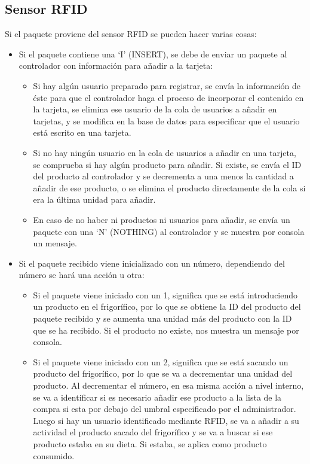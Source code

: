 \subsection{Sensor RFID}
Si el paquete proviene del sensor RFID se pueden hacer varias cosas:
\begin{itemize}
    \item Si el paquete contiene una ‘I’ (INSERT), se debe de enviar un paquete al controlador con información para añadir a la tarjeta: 
    \begin{itemize}
        \item Si hay algún usuario preparado para registrar, se envía la información de éste para que el controlador haga el proceso de incorporar el contenido en la tarjeta, se elimina ese usuario de la cola de usuarios a añadir en tarjetas, y se modifica en la base de datos para especificar que el usuario está escrito en una tarjeta.
        \item Si no hay ningún usuario en la cola de usuarios a añadir en una tarjeta, se comprueba si hay algún producto para añadir. Si existe, se envía el ID del producto al controlador y se decrementa a una menos la cantidad a añadir de ese producto, o se elimina el producto directamente de la cola si era la última unidad para añadir.
        \item En caso de no haber ni productos ni usuarios para añadir, se envía un paquete con una ‘N’ (NOTHING) al controlador y se muestra por consola un mensaje.
    \end{itemize}
    \item Si el paquete recibido viene inicializado con un número, dependiendo del número se hará una acción u otra:
    \begin{itemize}
        \item Si el paquete viene iniciado con un 1, significa que se está introduciendo un producto en el frigorífico, por lo que se obtiene la ID del producto del paquete recibido y se aumenta una unidad más del producto con la ID que se ha recibido. Si el producto no existe, nos muestra un mensaje por consola.
        \item Si el paquete viene iniciado con un 2, significa que se está sacando un producto del frigorífico, por lo que se va a decrementar una unidad del producto. Al decrementar el número, en esa misma acción a nivel interno, se va a identificar si es necesario añadir ese producto a la lista de la compra si esta por debajo del umbral especificado por el administrador. Luego si hay un usuario identificado mediante RFID, se va a añadir a su actividad el producto sacado del frigorífico y se va a buscar si ese producto estaba en su dieta. Si estaba, se aplica como producto consumido.

\end{itemize}
\end{itemize}
